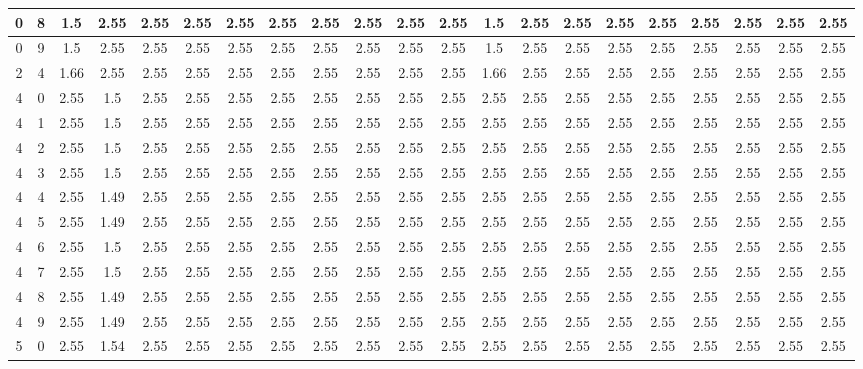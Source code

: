 \begin{landscape}
\begin{longtable}{|c|c||c||c|c|c|c|c|c|c|c|c||c|c|c|c|c|c|c|c|c|}
	0 & 8 & 1.5 & 2.55 & 2.55 & 2.55 & 2.55 & 2.55 & 2.55 & 2.55 & 2.55 & 2.55 & 1.5 & 2.55 & 2.55 & 2.55 & 2.55 & 2.55 & 2.55 & 2.55 & 2.55 \\ \hline
	0 & 9 & 1.5 & 2.55 & 2.55 & 2.55 & 2.55 & 2.55 & 2.55 & 2.55 & 2.55 & 2.55 & 1.5 & 2.55 & 2.55 & 2.55 & 2.55 & 2.55 & 2.55 & 2.55 & 2.55 \\ \hline
	2 & 4 & 1.66 & 2.55 & 2.55 & 2.55 & 2.55 & 2.55 & 2.55 & 2.55 & 2.55 & 2.55 & 1.66 & 2.55 & 2.55 & 2.55 & 2.55 & 2.55 & 2.55 & 2.55 & 2.55 \\ \hline
	4 & 0 & 2.55 & 1.5 & 2.55 & 2.55 & 2.55 & 2.55 & 2.55 & 2.55 & 2.55 & 2.55 & 2.55 & 2.55 & 2.55 & 2.55 & 2.55 & 2.55 & 2.55 & 2.55 & 2.55 \\ \hline
	4 & 1 & 2.55 & 1.5 & 2.55 & 2.55 & 2.55 & 2.55 & 2.55 & 2.55 & 2.55 & 2.55 & 2.55 & 2.55 & 2.55 & 2.55 & 2.55 & 2.55 & 2.55 & 2.55 & 2.55 \\ \hline
	4 & 2 & 2.55 & 1.5 & 2.55 & 2.55 & 2.55 & 2.55 & 2.55 & 2.55 & 2.55 & 2.55 & 2.55 & 2.55 & 2.55 & 2.55 & 2.55 & 2.55 & 2.55 & 2.55 & 2.55 \\ \hline
	4 & 3 & 2.55 & 1.5 & 2.55 & 2.55 & 2.55 & 2.55 & 2.55 & 2.55 & 2.55 & 2.55 & 2.55 & 2.55 & 2.55 & 2.55 & 2.55 & 2.55 & 2.55 & 2.55 & 2.55 \\ \hline
	4 & 4 & 2.55 & 1.49 & 2.55 & 2.55 & 2.55 & 2.55 & 2.55 & 2.55 & 2.55 & 2.55 & 2.55 & 2.55 & 2.55 & 2.55 & 2.55 & 2.55 & 2.55 & 2.55 & 2.55 \\ \hline
	4 & 5 & 2.55 & 1.49 & 2.55 & 2.55 & 2.55 & 2.55 & 2.55 & 2.55 & 2.55 & 2.55 & 2.55 & 2.55 & 2.55 & 2.55 & 2.55 & 2.55 & 2.55 & 2.55 & 2.55 \\ \hline
	4 & 6 & 2.55 & 1.5 & 2.55 & 2.55 & 2.55 & 2.55 & 2.55 & 2.55 & 2.55 & 2.55 & 2.55 & 2.55 & 2.55 & 2.55 & 2.55 & 2.55 & 2.55 & 2.55 & 2.55 \\ \hline
	4 & 7 & 2.55 & 1.5 & 2.55 & 2.55 & 2.55 & 2.55 & 2.55 & 2.55 & 2.55 & 2.55 & 2.55 & 2.55 & 2.55 & 2.55 & 2.55 & 2.55 & 2.55 & 2.55 & 2.55 \\ \hline
	4 & 8 & 2.55 & 1.49 & 2.55 & 2.55 & 2.55 & 2.55 & 2.55 & 2.55 & 2.55 & 2.55 & 2.55 & 2.55 & 2.55 & 2.55 & 2.55 & 2.55 & 2.55 & 2.55 & 2.55 \\ \hline
	4 & 9 & 2.55 & 1.49 & 2.55 & 2.55 & 2.55 & 2.55 & 2.55 & 2.55 & 2.55 & 2.55 & 2.55 & 2.55 & 2.55 & 2.55 & 2.55 & 2.55 & 2.55 & 2.55 & 2.55 \\ \hline
	5 & 0 & 2.55 & 1.54 & 2.55 & 2.55 & 2.55 & 2.55 & 2.55 & 2.55 & 2.55 & 2.55 & 2.55 & 2.55 & 2.55 & 2.55 & 2.55 & 2.55 & 2.55 & 2.55 & 2.55 \\ \hline

\end{longtable}
\end{landscape}
